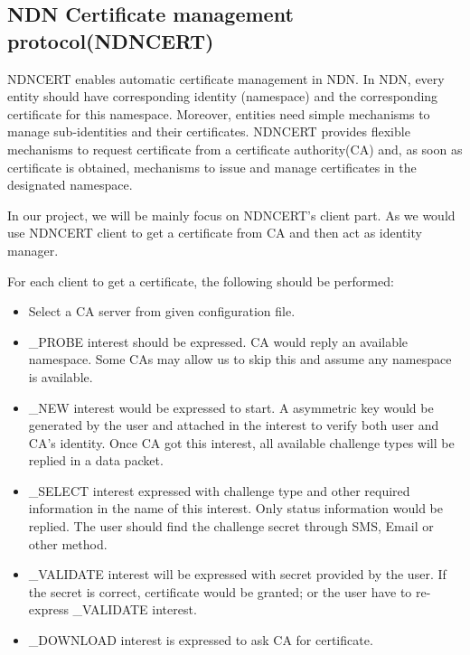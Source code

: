 \documentclass[a0,portrait]{poster}
\begin{document}
\begin{multicols}{2}

\subsection*{NDN Certificate management protocol(NDNCERT)\cite{zhang2017ndncert}}
\par
	NDNCERT enables automatic certificate management in NDN. 
	In NDN, every entity should have corresponding identity (namespace) and the corresponding certificate for this namespace. 
	Moreover, entities need simple mechanisms to manage sub-identities and their certificates. 
	NDNCERT provides flexible mechanisms to request certificate from a certificate authority(CA) and, as soon as certificate is obtained, mechanisms to issue and manage certificates in the designated namespace.
\par
	In our project, we will be mainly focus on NDNCERT's client part. 
	As we would use NDNCERT client to get a certificate from CA and then act as identity manager.
\par
	For each client to get a certificate, the following should be performed:
	\begin{itemize}
		\item Select a CA server from given configuration file.
		\item \_PROBE interest should be expressed. CA would reply an available namespace. Some CAs may allow us to skip this and assume any namespace is available.
		\item \_NEW interest would be expressed to start. A asymmetric key would be generated by the user and attached in the interest to verify both user and CA's identity. Once CA got this interest, all available challenge types will be replied in a data packet.
		\item \_SELECT interest expressed with challenge type and other required information in the name of this interest. Only status information would be replied. The user should find the challenge secret through SMS, Email or other method.
		\item \_VALIDATE interest will be expressed with secret provided by the user. If the secret is correct, certificate would be granted; or the user have to re-express \_VALIDATE interest.
		\item \_DOWNLOAD interest is expressed to ask CA for certificate.
	\end{itemize}



\end{multicols}
\end{document}
